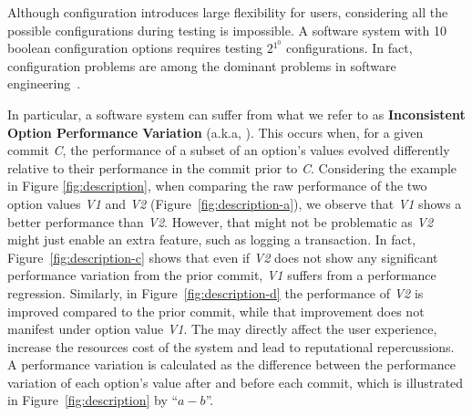 Although configuration introduces large flexibility for users, considering all the possible configurations during testing is impossible. A software system with 10 boolean configuration options requires testing $2{^1^0}$ configurations. In fact, configuration problems are among the dominant %
problems in software engineering~\cite{tse,RN2897}.

In particular, a software system can suffer from what we refer to as \textbf{Inconsistent Option Performance Variation} (a.k.a, \inconsistent). This occurs when, for a given commit \emph{C}, the performance of a subset of an option's values evolved differently relative to their performance in the commit prior to \emph{C}. Considering the example in Figure \ref{fig:description}, when comparing the raw performance of the two option values \emph{V1} and \emph{V2} (Figure~\ref{fig:description-a}), we observe that \emph{V1} shows a better performance than \emph{V2}. However, that might not be problematic as \emph{V2} might just enable an extra feature, such as logging a transaction. In fact, Figure~\ref{fig:description-c} shows that even if \emph{V2} does not show any significant performance variation from the prior commit, \emph{V1} suffers from a performance regression.  
Similarly, in Figure~\ref{fig:description-d} the performance of \emph{V2} is improved compared to the prior commit, while that improvement does not manifest under option value \emph{V1}. The \inconsistent may directly affect the user experience, increase the resources cost of the system and lead to reputational repercussions. %
A performance variation is calculated as the difference between the performance variation of each option's value after and before each commit, which is illustrated in Figure~\ref{fig:description} by ``$a - b$''.


